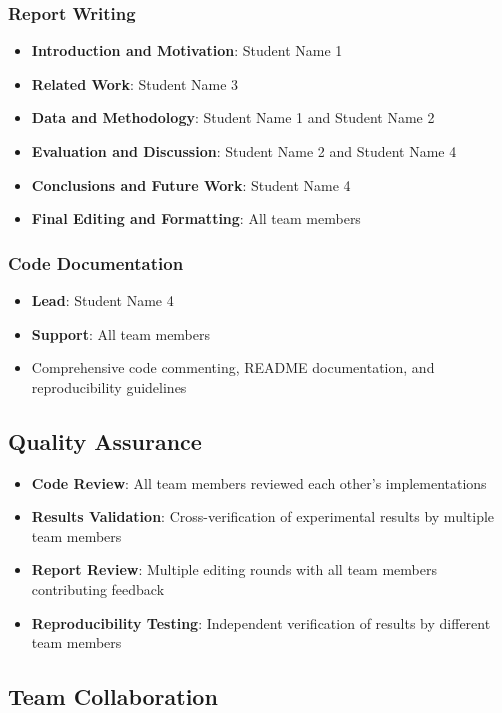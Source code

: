 \documentclass[11pt,a4paper]{article}
\begin{document}
\subsubsection{Report Writing}
\begin{itemize}
    \item \textbf{Introduction and Motivation}: Student Name 1
    \item \textbf{Related Work}: Student Name 3
    \item \textbf{Data and Methodology}: Student Name 1 and Student Name 2
    \item \textbf{Evaluation and Discussion}: Student Name 2 and Student Name 4
    \item \textbf{Conclusions and Future Work}: Student Name 4
    \item \textbf{Final Editing and Formatting}: All team members
\end{itemize}

\subsubsection{Code Documentation}
\begin{itemize}
    \item \textbf{Lead}: Student Name 4
    \item \textbf{Support}: All team members
    \item Comprehensive code commenting, README documentation, and repro\-duci\-bility guidelines
\end{itemize}

\subsection{Quality Assurance}

\begin{itemize}
    \item \textbf{Code Review}: All team members reviewed each other's implementations
    \item \textbf{Results Validation}: Cross-verification of experimental results by multiple team members
    \item \textbf{Report Review}: Multiple editing rounds with all team members contributing feedback
    \item \textbf{Reproducibility Testing}: Independent verification of results by different team members
\end{itemize}

\subsection{Team Collaboration}
\end{document}
